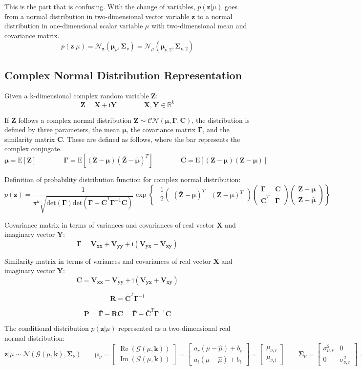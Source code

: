 \documentclass{article}         %
\theoremstyle{definition}
\theoremstyle{remark}
\newcommand{\eq}[1]{\begin{equation} #1 \end{equation}}
\newcommand{\R}{\mathbb{R}}
\newcommand{\Pbf}{\mathbf{P}}
\newcommand{\Rbf}{\mathbf{R}}
\newcommand{\Xbf}{\mathbf{X}}
\newcommand{\Ybf}{\mathbf{Y}}
\newcommand{\zbf}{\mathbf{z}}
\newcommand{\Zbf}{\mathbf{Z}}
\newcommand{\mubf}{\boldsymbol{\mu}}
\newcommand{\Gammabf}{\mathbf{\Gamma}}
\newcommand{\Cbf}{\mathbf{C}}
\newcommand{\Sigmabf}{\boldsymbol{\Sigma}}
\newcommand{\zcond}{\mathbf{z}|\mu}
\newcommand{\signalG}{\mathcal{G}\paren{\mu,\mathbf{k}}}
\newcommand{\Nscript}{\mathcal{N}}
\newcommand{\CNscript}{\mathcal{CN}}
\newcommand{\im}{\mathrm{i}}
\newcommand{\paren}[1]{\left(#1\right)}
\newcommand{\bracket}[1]{\left[#1\right]}
\newcommand{\arr}[2]{\begin{array}{#1} #2 \end{array}}
\newcommand{\brkarray}[2]{\bracket{\arr{#1}{#2}}}
\newcommand{\expect}[1]{\mathrm{E}\left[#1\right]}
\newcommand{\reop}[1]{\operatorname{Re}\paren{#1}}
\newcommand{\imop}[1]{\operatorname{Im}\paren{#1}}
\newcommand{\qq}{\qquad\qquad}
\newcommand{\CNpdf}[5]{\frac{1}{\pi^{#1}\sqrt{\mathrm{det}\paren{#4}\mathrm{det}\paren{\bar{#4} - \bar{#5}^T#4^{-1}#5}}} \exp\left\{-\frac{1}{2} \paren{\begin{array}{cc}\paren{\bar{#2} - \bar{#3}}^T & \paren{#2 - #3}^T\end{array}} \paren{\begin{array}{cc} #4 & #5 \\ \bar{#5}^T & \bar{#4} \end{array}}\paren{\begin{array}{c} #2 - #3 \\ \bar{#2} - \bar{#3} \end{array}}\right\}}
\begin{document}
This is the part that is confusing. With the change of variables, $p\paren{\zcond}$ goes from a normal distribution in two-dimensional vector variable $\zbf$ to a normal distribution in one-dimensional scalar variable $\mu$ with two-dimensional mean and covariance matrix.
\eq{p\paren{\zcond} = \Nscript_\zbf\paren{\mubf_\nu,\Sigmabf_\nu} = \Nscript_\mu\paren{\mubf_{\nu,2},\Sigmabf_{\nu,2}}}

\subsection{Complex Normal Distribution Representation}

Given a k-dimensional complex random variable $\Zbf$:
\begin{equation}
	\Zbf = \Xbf + \im\Ybf
	\qq \Xbf,\Ybf\in\R^k
\end{equation}

If $\Zbf$ follows a complex normal distribution $\Zbf\sim\CNscript\paren{\mubf,\Gammabf,\Cbf}$, the distribution is defined by three parameters, the mean $\mubf$, the covariance matrix $\Gammabf$, and the similarity matrix $\Cbf$. These are defined as follows, where the bar represents the complex conjugate.
\begin{equation}
	\mubf = \expect{\Zbf}
	\qq \Gammabf = \expect{\paren{\Zbf - \mubf}\paren{\bar{\Zbf} - \bar{\mubf}}^T}
	\qq \Cbf = \expect{\paren{\Zbf - \mubf}\paren{\Zbf - \mubf}}
\end{equation}

Definition of probability distribution function for complex normal distribution:
\begin{equation}
	p\paren{\zbf} = \CNpdf{k}{\Zbf}{\mubf}{\Gammabf}{\Cbf}
\end{equation}

Covariance matrix in terms of variances and covariances of real vector $\Xbf$ and imaginary vector $\Ybf$:
\eq{\Gammabf = \mathbf{V_{xx}} + \mathbf{V_{yy}} + \im\paren{\mathbf{V_{yx}} - \mathbf{V_{xy}}}}

Similarity matrix in terms of variances and covariances of real vector $\Xbf$ and imaginary vector $\Ybf$:
\eq{\Cbf = \mathbf{V_{xx}} - \mathbf{V_{yy}} + \im\paren{\mathbf{V_{yx}} + \mathbf{V_{xy}}}}

\eq{\Rbf = \bar{\Cbf}^T\Gammabf^{-1}}

\eq{\Pbf = \bar{\Gammabf} - \Rbf\Cbf = \bar{\Gammabf} - \bar{\Cbf}^T\Gammabf^{-1}\Cbf}

The conditional distribution $p\paren{\zcond}$ represented as a two-dimensional real normal distribution:
\eq{\zcond \sim \Nscript\paren{\signalG,\Sigmabf_\nu} 
	\qquad \mubf_\nu = \bracket{\arr{c}{ \reop{\signalG} \\ \imop{\signalG} }} = \brkarray{c}{ a_r\paren{\mu - \hat{\mu}} + b_r \\ a_i\paren{\mu - \hat{\mu}} + b_i } = \bracket{\arr{c}{ \mu_{\nu,r} \\ \mu_{\nu,i} }}
	\qquad \Sigmabf_\nu = \brkarray{cc}{ \sigma_{\nu,r}^2 & 0 \\ 0 & \sigma_{\nu,r}^2 } = \brkarray{cc}{ \sigma_\nu^2 & 0 \\ 0 & \sigma_\nu^2 }}
\end{document}
